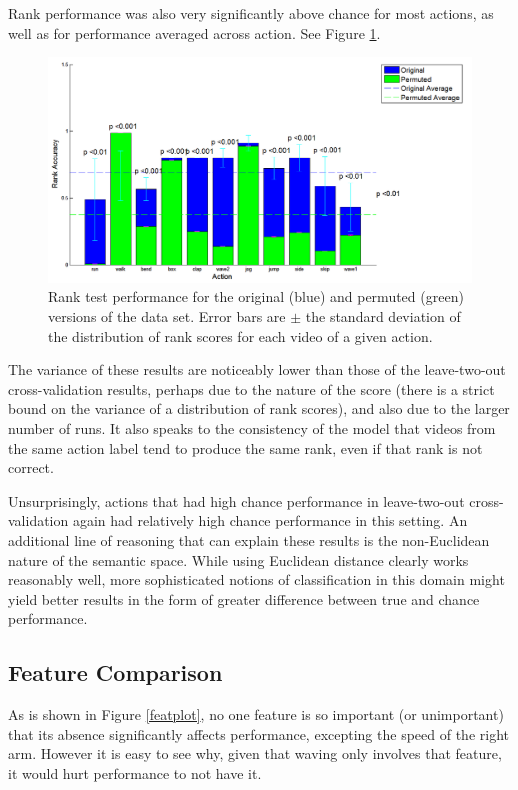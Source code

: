 \documentclass{article}
\begin{document}
Rank performance was also very significantly above chance for most actions, as well as for performance averaged across action. See Figure \ref{rankplot}.

\begin{figure}[h]
  \centering
  \includegraphics[width=.85\linewidth]{rank_snap_new}
  \caption{Rank test performance for the original (blue) and permuted (green) versions of the data set.  Error bars are $\pm$ the standard deviation of the distribution of rank scores for each video of a given action.}
  \label{rankplot}
\end{figure}

The variance of these results are noticeably lower than those of the leave-two-out cross-validation results, perhaps due to the nature of the score (there is a strict bound on the variance of a distribution of rank scores), and also due to the larger number of runs.  It also speaks to the consistency of the model that videos from the same action label tend to produce the same rank, even if that rank is not correct.

Unsurprisingly, actions that had high chance performance in leave-two-out cross-validation again had relatively high chance performance in this setting. An additional line of reasoning that can explain these results is the non-Euclidean nature of the semantic space. While using Euclidean distance clearly works reasonably well, more sophisticated notions of classification in this domain might yield better results in the form of greater difference between true and chance performance.

\subsection{Feature Comparison}

As is shown in Figure \ref{featplot}, no one feature is so important (or unimportant) that its absence significantly affects performance, excepting the speed of the right arm.  However it is easy to see why, given that waving only involves that feature, it would hurt performance to not have it.
\end{document}
